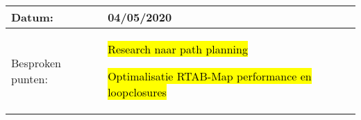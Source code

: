 \begin{tabularx}{\textwidth}{| l | X |}
  \hline
  Datum: & 04/05/2020\\
  \hline
  Besproken punten: &
  \begin{compactitem}
    \item \hl{Research naar path planning}
    \item \hl{Optimalisatie RTAB-Map performance en loopclosures}
  \end{compactitem}\\
  \hline
\end{tabularx}